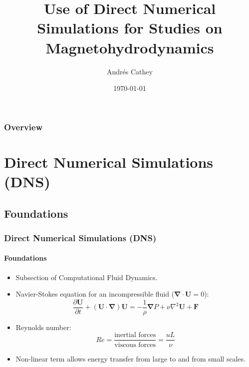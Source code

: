 \documentclass{beamer}
\title{Use of Direct Numerical Simulations for Studies on Magnetohydrodynamics}
\author{Andr\'es Cathey}
\institute{The University of Edinburgh}
\date{\today}
\begin{document}
\frame{\titlepage}


\begin{frame}
\frametitle{Overview}
\tableofcontents
\end{frame}


\section{Direct Numerical Simulations (DNS)}

\subsection{Foundations}

\begin{frame}
 \frametitle{Direct Numerical Simulations (DNS)} %
 \framesubtitle{Foundations}
 
 \begin{itemize}
  \item Subsection of Computational Fluid Dynamics.
  \item<2-> Navier-Stokes equation for an incompressible fluid ($\bm \nabla \cdot \bm U = 0$): \begin{equation}
                                \frac{\partial \bm U}{\partial t} + (\bm U \cdot \bm \nabla) \bm U = - \frac{1}{\rho} \bm \nabla P + \nu \nabla ^ 2 \bm U + \bm F
                               \end{equation}
  \item<3-> Reynolds number: \begin{equation}
                              Re = \frac{\text{inertial forces}}{\text{viscous forces}} = \frac{u L}{\nu}
                             \end{equation} %

  \item<4-> Non-linear term allows energy transfer from large to and from small scales.
 \end{itemize}
  
\end{frame}
\end{document}
